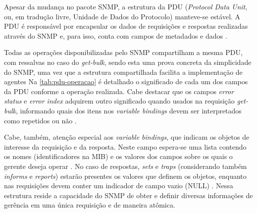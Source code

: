 \documentclass[twoside,english,brazilian]{UNISINOSmonografia}
\begin{document}
Apesar da mudança no pacote SNMP, a estrutura da PDU (\textit{Protocol Data 
Unit}, ou, em tradução livre, Unidade de Dados do Protocolo) manteve-se 
estável.
A PDU é responsável por encapsular os dados de requisições e respostas 
realizadas através do SNMP e, para isso, conta com campos de metadados 
e dados \cite{perkins1997understanding}.


Todas as operações disponibilizadas pelo SNMP compartilham a mesma PDU, 
com ressalvas no caso do \textit{get-bulk}, sendo esta uma prova concreta
da simplicidade do SNMP, uma vez que a estrutura compartilhada facilita
a implementação de agentes \cite{Clemm2006}
Na \autoref{tab:pdu-operacao} é detalhado o significado de cada um dos
campos da PDU conforme a operação realizada.
Cabe destacar que os campos \textit{error status} e \textit{error index} 
adquirem outro significado quando usados na requisição \textit{get-bulk},
informando quais dos itens nos \textit{variable bindings} devem ser 
interpretados como repetidos ou não \cite{perkins1997understanding}.


Cabe, também, atenção especial aos \textit{variable bindings}, que indicam 
os objetos de interesse da requisição e da resposta.
Neste campo espera-se uma lista contendo os nomes (identificadores na MIB) 
e os valores dos campos sobre os quais o gerente deseja operar 
\cite{Simoneau1999}.
No caso de respostas, \textit{sets} e \textit{traps} 
(considerando também \textit{informs} e \textit{reports})
estarão presentes os valores que definem os objetos, enquanto nas requisições
devem conter um indicador de campo vazio (NULL) \cite{Clemm2006}.
Nessa estrutura reside a capacidade do SNMP de obter e definir diversas 
informações de gerência em uma única requisição e de maneira atômica.
\end{document}
